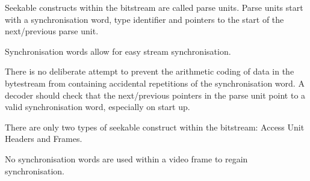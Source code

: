 
Seekable constructs within the bitstream are called parse units.  Parse
units start with a synchronisation word, type identifier and pointers to
the start of the next/previous parse unit.

Synchronisation words allow for easy stream synchronisation.

There is no deliberate attempt to prevent the arithmetic coding of data
in the bytestream from containing accidental repetitions of the
synchronisation word. A decoder should check that the next/previous
pointers in the parse unit point to a valid synchronisation word,
especially on start up.

There are only two types of seekable construct within the bitstream:
Access Unit Headers and Frames.

No synchronisation words are used within a video frame to regain
synchronisation.
